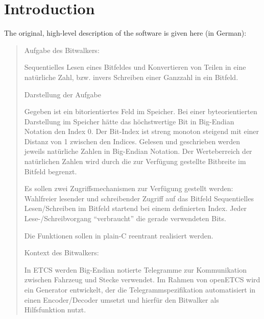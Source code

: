 
\section{Introduction}
\label{sec:introduction}

The original, high-level description of the \bitwalker software is given here (in German):


\begin{quote}
 
Aufgabe des Bitwalkers:
 
Sequentielles Lesen eines Bitfeldes und Konvertieren von Teilen in eine natürliche Zahl,
bzw. invers Schreiben einer Ganzzahl in ein Bitfeld.
 
Darstellung der Aufgabe
 
Gegeben ist ein bitorientiertes Feld im Speicher.
Bei einer byteorientierten Darstellung im Speicher hätte das höchstwertige Bit
in Big-Endian Notation den Index 0.
Der Bit-Index ist streng monoton steigend mit einer Distanz von 1 zwischen den Indices.
Gelesen und geschrieben werden jeweils natürliche Zahlen in Big-Endian Notation.
Der Werteberreich der natürlichen Zahlen wird durch die zur Verfügung gestellte Bitbreite
im Bitfeld begrenzt.
 
Es sollen zwei Zugriffsmechanismen zur Verfügung gestellt werden:
Wahlfreier lesender und schreibender Zugriff auf das Bitfeld
Sequentielles Lesen/Schreiben im Bitfeld startend bei einem definierten Index.
Jeder Lese-/Schreibvorgang ``verbraucht'' die gerade verwendeten Bits.
 
Die Funktionen sollen in plain-C reentrant realisiert werden.
 
Kontext des Bitwalkers:
 
In ETCS werden Big-Endian notierte Telegramme zur Kommunikation zwischen Fahrzeug und
Stecke verwendet.
Im Rahmen von openETCS wird ein Generator entwickelt,
der die Telegrammspezifikation automatisiert in einen
Encoder/Decoder umsetzt und hierfür den Bitwalker als Hilfsfunktion nutzt.
\end{quote}






